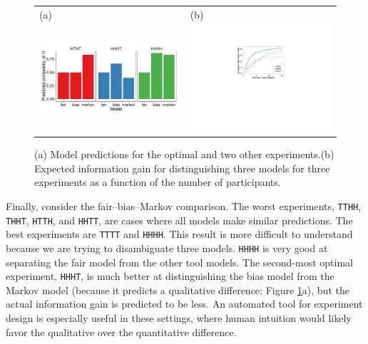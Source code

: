 \documentclass{article}
\begin{document}

\begin{figure}[t]
\centering
\begin{tabular}{l l}
(a) & (b)\\
\includegraphics[width=0.6\columnwidth]{img/coin_predictions.pdf} &
\includegraphics[width=0.4\columnwidth]{img/coin_eig_3way_nsubj_wlegend.pdf} \\\end{tabular}
\caption{(a) Model predictions for the optimal and two other experiments.(b) Expected information gain for distinguishing three models for three experiments as a function of the number of participants.}
\label{fig:coin_preds}
\end{figure}

Finally, consider the fair--bias--Markov comparison.
The worst experiments, \lstinline{TTHH}, \lstinline{THHT}, \lstinline{HTTH}, and \lstinline{HHTT}, are cases where all models make similar predictions.
The best experiments are \lstinline{TTTT} and \lstinline{HHHH}.
This result is more difficult to understand because we are trying to disambiguate three models.
\lstinline{HHHH} is very good at separating the fair model from the other tool models.
The second-most optimal experiment, \lstinline{HHHT}, is much better at distinguishing the bias model from the Markov model (because it predicts a qualitative difference; Figure \ref{fig:coin_preds}a), but the actual information gain is predicted to be less.
An automated tool for experiment design is especially useful in these settings, where human intuition would likely favor the qualitative over the quantitative difference.
\end{document}
